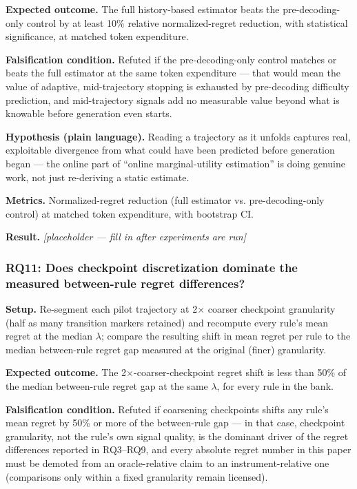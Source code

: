 \documentclass[11pt]{article}
\newcommand{\ph}{\textit{[placeholder --- fill in after experiments are run]}}
\begin{document}
\textbf{Expected outcome.} The full history-based estimator beats the pre-decoding-only control by at least 10\% relative normalized-regret reduction, with statistical significance, at matched token expenditure.

\textbf{Falsification condition.} Refuted if the pre-decoding-only control matches or beats the full estimator at the same token expenditure --- that would mean the value of adaptive, mid-trajectory stopping is exhausted by pre-decoding difficulty prediction, and mid-trajectory signals add no measurable value beyond what is knowable before generation even starts.

\textbf{Hypothesis (plain language).} Reading a trajectory as it unfolds captures real, exploitable divergence from what could have been predicted before generation began --- the online part of ``online marginal-utility estimation'' is doing genuine work, not just re-deriving a static estimate.

\textbf{Metrics.} Normalized-regret reduction (full estimator vs. pre-decoding-only control) at matched token expenditure, with bootstrap CI.

\textbf{Result.} \ph

\subsubsection{RQ11: Does checkpoint discretization dominate the measured between-rule regret differences?}
\textbf{Setup.} Re-segment each pilot trajectory at 2$\times$ coarser checkpoint granularity (half as many transition markers retained) and recompute every rule's mean regret at the median $\lambda$; compare the resulting shift in mean regret per rule to the median between-rule regret gap measured at the original (finer) granularity.

\textbf{Expected outcome.} The 2$\times$-coarser-checkpoint regret shift is less than 50\% of the median between-rule regret gap at the same $\lambda$, for every rule in the bank.

\textbf{Falsification condition.} Refuted if coarsening checkpoints shifts any rule's mean regret by 50\% or more of the between-rule gap --- in that case, checkpoint granularity, not the rule's own signal quality, is the dominant driver of the regret differences reported in RQ3--RQ9, and every absolute regret number in this paper must be demoted from an oracle-relative claim to an instrument-relative one (comparisons only within a fixed granularity remain licensed).
\end{document}
